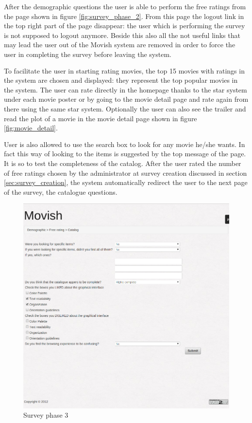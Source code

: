 After the demographic questions the user is able to perform the free ratings from the page shown in figure \ref{fig:survey_phase_2}. From this page the logout link in the top right part of the page disappear: the user which is performing the survey is not supposed to logout anymore. Beside this also all the not useful links that may lead the user out of the Movish system are removed in order to force the user in completing the survey before leaving the system.

To facilitate the user in starting rating movies, the top 15 movies with ratings in the system are chosen and displayed: they represent the top popular movies in the system. The user can rate directly in the homepage thanks to the star system under each movie poster or by going to the movie detail page and rate again from there using the same star system. Optionally the user can also see the trailer and read the plot of a movie in the movie detail page shown in figure \ref{fig:movie_detail}.

User is also allowed to use the search box to look for any movie he/she wants. In fact this way of looking to the items is suggested by the top message of the page. It is so to test the completeness of the catalog. After the user rated the number of free ratings chosen by the administrator at survey creation discussed in section \ref{sec:survey_creation}, the system automatically redirect the user to the next page of the survey, the catalogue questions.

\begin{figure}
  \centering
  \includegraphics[width=\textwidth]{figures/survey_catalog.png}
  \caption{Survey phase 3}
  \label{fig:survey_phase_3}
\end{figure}

